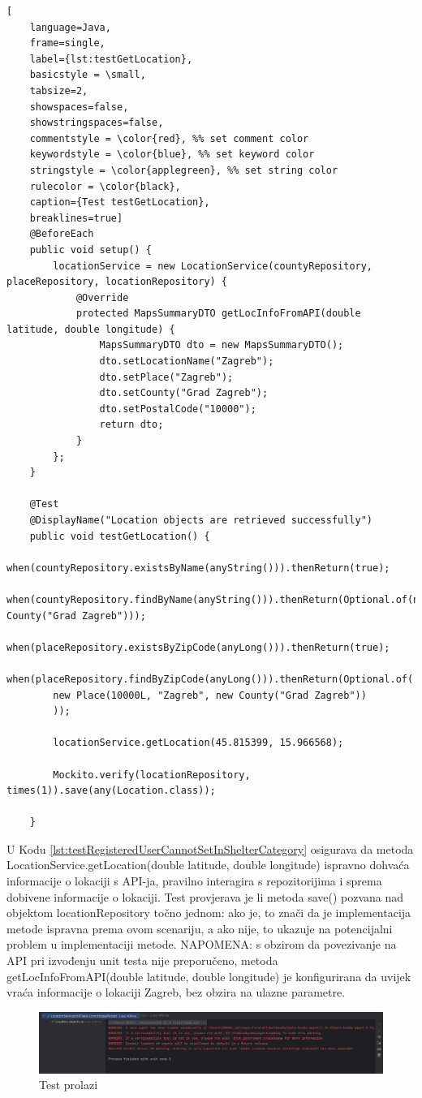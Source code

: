 \begin{lstlisting}[
	language=Java,
	frame=single,
	label={lst:testGetLocation},
	basicstyle = \small,
	tabsize=2,
	showspaces=false,
	showstringspaces=false,
	commentstyle = \color{red}, %% set comment color
	keywordstyle = \color{blue}, %% set keyword color
	stringstyle = \color{applegreen}, %% set string color
	rulecolor = \color{black},
	caption={Test testGetLocation},
	breaklines=true]
	@BeforeEach
	public void setup() {
		locationService = new LocationService(countyRepository, placeRepository, locationRepository) {
			@Override
			protected MapsSummaryDTO getLocInfoFromAPI(double latitude, double longitude) {
				MapsSummaryDTO dto = new MapsSummaryDTO();
				dto.setLocationName("Zagreb");
				dto.setPlace("Zagreb");
				dto.setCounty("Grad Zagreb");
				dto.setPostalCode("10000");
				return dto;
			}
		};
	}
	
	@Test
	@DisplayName("Location objects are retrieved successfully")
	public void testGetLocation() {
		when(countyRepository.existsByName(anyString())).thenReturn(true);
		when(countyRepository.findByName(anyString())).thenReturn(Optional.of(new County("Grad Zagreb")));
		when(placeRepository.existsByZipCode(anyLong())).thenReturn(true);
		when(placeRepository.findByZipCode(anyLong())).thenReturn(Optional.of(
		new Place(10000L, "Zagreb", new County("Grad Zagreb"))
		));
		
		locationService.getLocation(45.815399, 15.966568);
		
		Mockito.verify(locationRepository, times(1)).save(any(Location.class));
		
	}
\end{lstlisting}

U Kodu \ref{lst:testRegisteredUserCannotSetInShelterCategory} osigurava da metoda LocationService.getLocation(double latitude, double longitude) ispravno dohvaća informacije o lokaciji s API-ja, pravilno interagira s repozitorijima i sprema dobivene informacije o lokaciji. Test provjerava je li metoda save() pozvana nad objektom locationRepository točno jednom: ako je, to znači da je implementacija metode ispravna prema ovom scenariju, a ako nije, to ukazuje na potencijalni problem u implementaciji metode. NAPOMENA: s obzirom da povezivanje na API pri izvođenju unit testa nije preporučeno, metoda getLocInfoFromAPI(double latitude, double longitude) je konfigurirana da uvijek vraća informacije o lokaciji Zagreb, bez obzira na ulazne parametre. 

\begin{figure}[!htb]
	\centering
	\includegraphics[width=\textwidth]{slike/test2.png}
	\caption{Test prolazi}
\end{figure}

